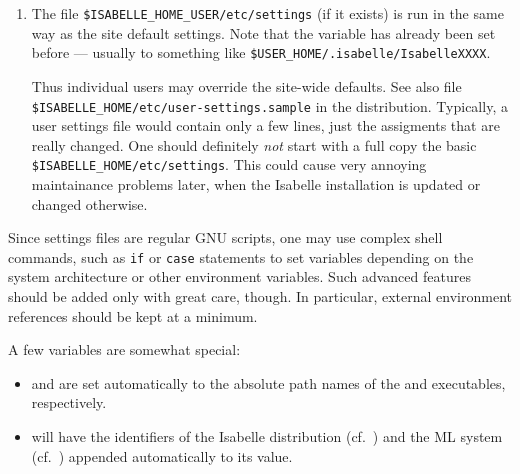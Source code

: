 \begin{isabellebody}
\begin{isamarkuptext}
\begin{enumerate}
  \item The file \verb|$ISABELLE_HOME_USER/etc/settings| (if it
  exists) is run in the same way as the site default settings. Note
  that the variable \hyperlink{setting.ISABELLE-HOME-USER}{\mbox{}} has already been set
  before --- usually to something like \verb|$USER_HOME/.isabelle/IsabelleXXXX|.
  
  Thus individual users may override the site-wide defaults.  See also
  file \verb|$ISABELLE_HOME/etc/user-settings.sample| in the
  distribution.  Typically, a user settings file would contain only a
  few lines, just the assigments that are really changed.  One should
  definitely \emph{not} start with a full copy the basic \verb|$ISABELLE_HOME/etc/settings|. This could cause very annoying
  maintainance problems later, when the Isabelle installation is
  updated or changed otherwise.
  
  \end{enumerate}

  Since settings files are regular GNU \hypertarget{executable.bash}{\hyperlink{executable.bash}{\mbox{}}} scripts,
  one may use complex shell commands, such as \verb|if| or
  \verb|case| statements to set variables depending on the
  system architecture or other environment variables.  Such advanced
  features should be added only with great care, though. In
  particular, external environment references should be kept at a
  minimum.

  \medskip A few variables are somewhat special:

  \begin{itemize}

  \item {}\hypertarget{setting.ISABELLE-PROCESS}{\hyperlink{setting.ISABELLE-PROCESS}{\mbox{}}} and \hypertarget{setting.ISABELLE-TOOL}{\hyperlink{setting.ISABELLE-TOOL}{\mbox{}}} are set
  automatically to the absolute path names of the \hyperlink{executable.isabelle-process}{\mbox{}} and \hyperlink{executable.isabelle}{\mbox{}} executables,
  respectively.
  
  \item {}\hyperlink{setting.ISABELLE-OUTPUT}{\mbox{}} will have the identifiers of
  the Isabelle distribution (cf.\ \hyperlink{setting.ISABELLE-IDENTIFIER}{\mbox{}}) and
  the ML system (cf.\ \hyperlink{setting.ML-IDENTIFIER}{\mbox{}}) appended automatically
  to its value.


\end{itemize}
\end{isamarkuptext}
\end{isabellebody}
